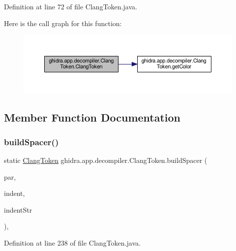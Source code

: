 Definition at line 72 of file Clang\+Token.\+java.

Here is the call graph for this function\+:
\nopagebreak
\begin{figure}[H]
\begin{center}
\leavevmode
\includegraphics[width=350pt]{classghidra_1_1app_1_1decompiler_1_1_clang_token_ad16c38cbfedefe4f3542219501135b8d_cgraph}
\end{center}
\end{figure}


\subsection{Member Function Documentation}
\mbox{\label{classghidra_1_1app_1_1decompiler_1_1_clang_token_abf895f740274c7d525f0aacb1fe1a3ed}} 
\subsubsection{\texorpdfstring{buildSpacer()}{buildSpacer()}}
{\footnotesize\ttfamily static \mbox{\hyperlink{classghidra_1_1app_1_1decompiler_1_1_clang_token}{Clang\+Token}} ghidra.\+app.\+decompiler.\+Clang\+Token.\+build\+Spacer (\begin{DoxyParamCaption}\item[{\mbox{\hyperlink{interfaceghidra_1_1app_1_1decompiler_1_1_clang_node}{Clang\+Node}}}]{par,  }\item[{int}]{indent,  }\item[{String}]{indent\+Str }\end{DoxyParamCaption})\hspace{0.3cm}{\ttfamily [inline]}, {\ttfamily [static]}}



Definition at line 238 of file Clang\+Token.\+java.

\mbox{\label{classghidra_1_1app_1_1decompiler_1_1_clang_token_a4d678725186dfa338226cce1d16417f5}} 
